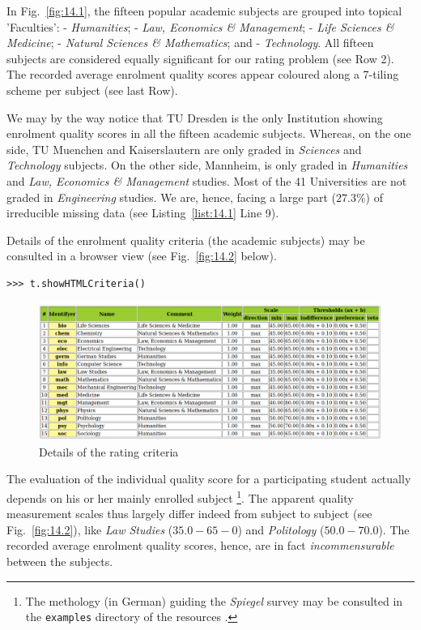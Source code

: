 In Fig.~\vref{fig:14.1}, the fifteen popular academic subjects are grouped into topical 'Faculties': - \emph{Humanities}; - \emph{Law, Economics \& Management}; - \emph{Life Sciences \& Medicine}; - \emph{Natural Sciences \& Mathematics}; and - \emph{Technology}. All fifteen subjects are considered equally significant for our rating problem (see Row 2). The recorded average enrolment quality scores appear coloured along a 7-tiling scheme per subject (see last Row).

We may by the way notice that TU Dresden is the only Institution showing enrolment quality scores in all the fifteen academic subjects. Whereas, on the one side, TU Muenchen and Kaiserslautern are only graded in \emph{Sciences} and \emph{Technology} subjects. On the other side, Mannheim, is only graded in \emph{Humanities} and \emph{Law, Economics \& Management} studies. Most of the 41 Universities are not graded in \emph{Engineering} studies. We are, hence, facing a large part ($27.3\%$) of irreducible missing data (see Listing~\vref{list:14.1} Line 9).

Details of the enrolment quality criteria (the academic subjects) may be consulted in a browser view (see Fig.~\vref{fig:14.2} below).
\begin{lstlisting}
>>> t.showHTMLCriteria()
\end{lstlisting}
 \begin{figure}[h]
\includegraphics[width=\hsize]{Figures/14-2-spiegelCriteria.png}
\caption{Details of the rating criteria}
\label{fig:14.2}       %
\end{figure}

The evaluation of the individual quality score for a participating student actually depends on his or her mainly enrolled subject \footnote{The methology (in German) guiding the \emph{Spiegel} survey may be consulted in the \texttt{examples} directory of the \Digraph resources \citep{SPI-2004m}.}. The apparent quality measurement scales thus largely differ indeed from subject to subject (see Fig.~\vref{fig:14.2}), like \emph{Law Studies} ($35.0 - 65-0$) and \emph{Politology} ($50.0 - 70.0$). The recorded average enrolment quality scores, hence, are in fact \emph{incommensurable} between the subjects.

